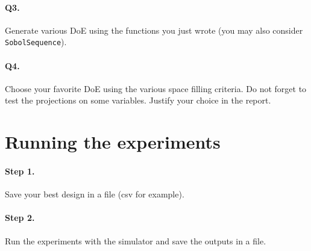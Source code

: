 \documentclass[12pt]{scrartcl}
\begin{document}
\paragraph{Q3.} Generate various DoE using the functions you just wrote (you may also consider \texttt{SobolSequence}).

\paragraph{Q4.} Choose your favorite DoE using the various space filling criteria. Do not forget to test the projections on some variables. Justify your choice in the report.

\section{Running the experiments}

\paragraph{Step 1.} Save your best design in a file (csv for example).

\paragraph{Step 2.} Run the experiments with the simulator and save the outputs in a file.
\end{document}
